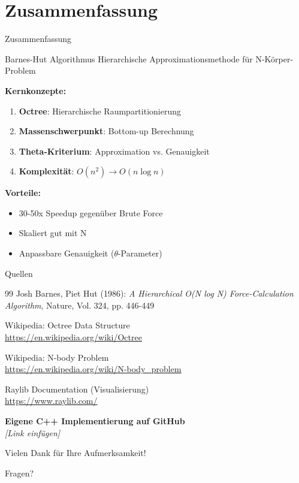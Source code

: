 \documentclass[xcolor=dvipsnames]{beamer}
\begin{document}
\section{Zusammenfassung}

\begin{frame}{Zusammenfassung}
\begin{block}{Barnes-Hut Algorithmus}
Hierarchische Approximationsmethode für N-Körper-Problem
\end{block}

\textbf{Kernkonzepte:}
\begin{enumerate}
    \item \textbf{Octree}: Hierarchische Raumpartitionierung
    \item \textbf{Massenschwerpunkt}: Bottom-up Berechnung
    \item \textbf{Theta-Kriterium}: Approximation vs. Genauigkeit
    \item \textbf{Komplexität}: $O(n^2) \rightarrow O(n \log n)$
\end{enumerate}

\vspace{0.3cm}
\textbf{Vorteile:}
\begin{itemize}
    \item 30-50x Speedup gegenüber Brute Force
    \item Skaliert gut mit N
    \item Anpassbare Genauigkeit ($\theta$-Parameter)
\end{itemize}
\end{frame}

\begin{frame}{Quellen}
\begin{thebibliography}{99}
Josh Barnes, Piet Hut (1986):
\textit{A Hierarchical O(N log N) Force-Calculation Algorithm},
Nature, Vol. 324, pp. 446-449

Wikipedia: Octree Data Structure \\
\url{https://en.wikipedia.org/wiki/Octree}

Wikipedia: N-body Problem \\
\url{https://en.wikipedia.org/wiki/N-body_problem}

Raylib Documentation (Visualisierung) \\
\url{https://www.raylib.com/}
\end{thebibliography}

\vspace{0.3cm}
\begin{center}
\textbf{Eigene C++ Implementierung auf GitHub} \\
\textit{[Link einfügen]}
\end{center}
\end{frame}

\begin{frame}
\begin{center}
{\Huge Vielen Dank für Ihre Aufmerksamkeit!}

\vspace{1cm}
{\Large Fragen?}
\end{center}
\end{frame}
\end{document}
